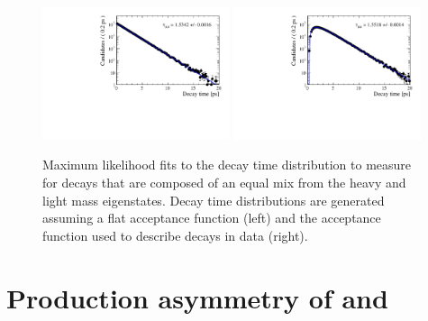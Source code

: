 \begin{figure}[htbp]
  \centering
    \includegraphics[width=0.49\textwidth]{./Figs/LifetimeSystematics/No_acc_fit.pdf}
    \includegraphics[width=0.49\textwidth]{./Figs/LifetimeSystematics/Acc_fit.pdf}
  \caption{Maximum likelihood fits to the decay time distribution to measure \tmumu for \bsmumu decays that are composed of an equal mix from the heavy and light mass eigenstates. Decay time distributions are generated assuming a flat acceptance function (left) and the acceptance function used to describe \bsmumu decays in data (right).}
  \label{fig:mixofstates}
\end{figure}


\section[Production asymmetry of \bs and $\overline{B}_{s}^{0}$}]{Production asymmetry of \boldmath{\bs} and }
\label{sec:productionasymetry}



